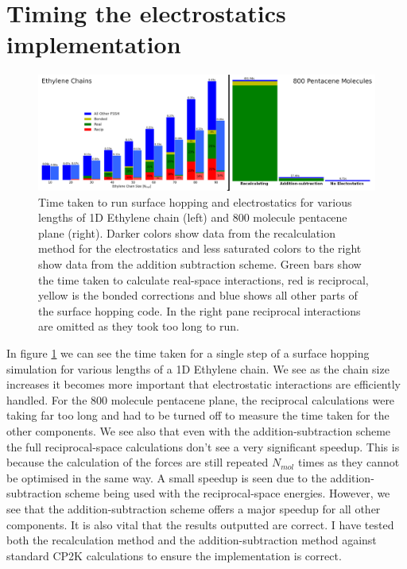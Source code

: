 \section{Timing the electrostatics implementation}
\begin{figure}[ht]
  \includegraphics[width=\textwidth]{./img/ES/TimingsReCalc_vs_AddSub.png}
  \caption{\label{fig:AddSubTimings}Time taken to run surface hopping and electrostatics for various lengths of 1D Ethylene chain (left) and 800 molecule pentacene plane (right). Darker colors show data from the recalculation method for the electrostatics and less saturated colors to the right show data from the addition subtraction scheme. Green bars show the time taken to calculate real-space interactions, red is reciprocal, yellow is the bonded corrections and blue shows all other parts of the surface hopping code. In the right pane reciprocal interactions are omitted as they took too long to run.}
\end{figure}
In figure \ref{fig:AddSubTimings} we can see the time taken for a single step of a surface hopping simulation for various lengths of a 1D Ethylene chain. We see as the chain size increases it becomes more important that electrostatic interactions are efficiently handled. For the 800 molecule pentacene plane, the reciprocal calculations were taking far too long and had to be turned off to measure the time taken for the other components. We see also that even with the addition-subtraction scheme the full reciprocal-space calculations don't see a very significant speedup. This is because the calculation of the forces are still repeated $N_{mol}$ times as they cannot be optimised in the same way. A small speedup is seen due to the addition-subtraction scheme being used with the reciprocal-space energies. However, we see that the addition-subtraction scheme offers a major speedup for all other components. It is also vital that the results outputted are correct. I have tested both the recalculation method and the addition-subtraction method against standard CP2K calculations to ensure the implementation is correct.

